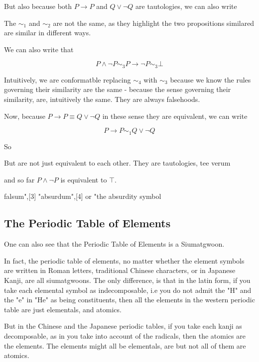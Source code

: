 But also because both $P \rightarrow P$ and $Q \vee \neg Q$ are tautologies, we can also write 



The $\sim_{1}$ and $\sim_{2}$ are not the same, as they highlight the two propositions similared are similar in different ways. 

We can also write that 

$$P \wedge \neg P \sim_{3} P\rightarrow \neg P \sim_{3} \bot$$



Intuitively, we are conformatble replacing $\sim_{4}$ with $\sim_{3}$ because we know the rules governing their similarity are the same - because the sense governing their similarity, are, intuitively the same. They are always falsehoods. 







Now, because $P \rightarrow P \equiv Q \vee \neg Q$ in these sense they are equivalent, we can write 

$$P \rightarrow P \sim_{1} Q \vee \neg Q$$





So 


But are not just equivalent to each other. They are tautologies, tee verum



and so far $P \wedge \neg P$ is equivalent to $\top$. 

falsum",[3] "absurdum",[4] or "the absurdity symbol

\subsection{The Periodic Table of Elements}

One can also see that the Periodic Table of Elements is a Siumatgwoon. 

In fact, the periodic table of elements, no matter whether the element symbols are written in Roman letters, traditional Chinese characters, or in Japanese Kanji, are all siumatgwoons. The only difference, is that in the latin form, if you take each elemental symbol as indecomposable, i.e you do not admit the "H" and the "e" in "He" as being constituents, then all the elements in the western periodic table are just elementals, and atomics. 

But in the Chinese and the Japanese periodic tables, if you take each kanji as decomposable, as in you take into account of the radicals, then the atomics are the elements. The elements might all be elementals, are but not all of them are atomics. 


